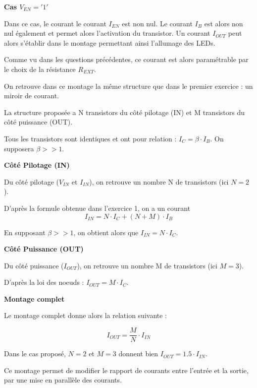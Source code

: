 \documentclass[a4paper,french]{paper}
\begin{document}
\textbf{Cas $V_{EN} = '1'$}

Dans ce cas, le courant le courant $I_{EN}$ est non nul. Le courant $I_B$ est alors non nul également et permet alors l'activation du transistor. Un courant $I_{OUT}$ peut alors s'établir dans le montage permettant ainsi l'allumage des LEDs.

Comme vu dans les questions précédentes, ce courant est alors paramétrable par le choix de la résistance $R_{EXT}$.

\newpage

On retrouve dans ce montage la même structure que dans le premier exercice : un miroir de courant.

La structure proposée a N transistors du côté pilotage (IN) et M transistors du côté puissance (OUT).

Tous les transistors sont identiques et ont pour relation : $I_{C} = \beta \cdot I_{B}$. On supposera $\beta >> 1$.

\textbf{Côté Pilotage (IN)}

Du côté pilotage ($V_{IN}$ et $I_{IN}$), on retrouve un nombre N de transistors (ici $N=2$).

D'après la formule obtenue dans l'exercice 1, on a un courant $$I_{IN} = N \cdot I_{C} + (N+M) \cdot I_{B}$$

En supposant $\beta >> 1$, on obtient alors que $I_{IN} = N \cdot I_C$.

\textbf{Côté Puissance (OUT)}

Du côté puissance ($I_{OUT}$), on retrouve un nombre M de transistors (ici $M=3$).

D'après la loi des noeuds : $I_{OUT} = M \cdot I_C$.

\textbf{Montage complet}

Le montage complet donne alors la relation suivante :

$$\boxed{I_{OUT} = \frac{M}{N} \cdot I_{IN}}$$

Dans le cas proposé, $N=2$ et $M=3$ donnent bien $I_{OUT} = 1.5 \cdot I_{IN}$.

Ce montage permet de modifier le rapport de courants entre l'entrée et la sortie, par une mise en parallèle des courants.


\end{document}
